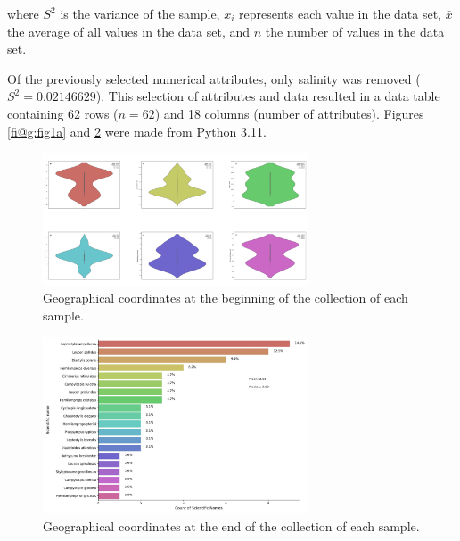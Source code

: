 where \( S^2 \) is the variance of the sample, \( x_i \) represents each value in the data set, \( \bar{x} \) the average of all values in the data set, and \( n \) the number of values in the data set.

Of the previously selected numerical attributes, only salinity was removed (\( S^2 = 0.02146629 \)). This selection of attributes and data resulted in a data table containing 62 rows (\( n=62 \)) and 18 columns (number of attributes). Figures \ref{fi@g:fig1a} and \ref{fig:fig1b} were made from Python 3.11.

\begin{figure}[]
    \centering
    \includegraphics[width=0.7\textwidth]{figure1.jpg}
    \caption{Geographical coordinates at the beginning of the collection of each sample. \label{fig:fig1a}}
\end{figure}

\begin{figure}[]
    \centering
    \includegraphics[width=0.7\textwidth]{figure2.jpg}
    \caption{Geographical coordinates at the end of the collection of each sample. \label{fig:fig1b}}
\end{figure}

